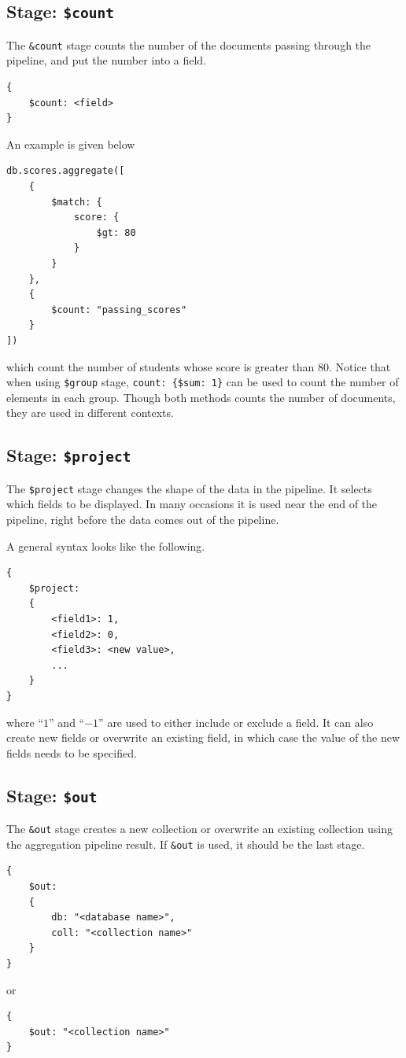 \subsection{Stage: \texttt{\$count}}

The \verb|&count| stage counts the number of the documents passing through the pipeline, and put the number into a field.
\begin{lstlisting}
{
	$count: <field>
}
\end{lstlisting}

An example is given below
\begin{lstlisting}
db.scores.aggregate([
	{
		$match: {
			score: {
				$gt: 80
			}
		}
	},
	{
		$count: "passing_scores"
	}
])
\end{lstlisting}
which count the number of students whose score is greater than $80$. Notice that when using \verb|$group| stage, \verb|count: {$sum: 1}| can be used to count the number of elements in each group. Though both methods counts the number of documents, they are used in different contexts.

\subsection{Stage: \texttt{\$project}}

The \verb|$project| stage changes the shape of the data in the pipeline. It selects which fields to be displayed. In many occasions it is used near the end of the pipeline, right before the data comes out of the pipeline. 

A general syntax looks like the following.
\begin{lstlisting}
{
	$project:
	{
		<field1>: 1,
		<field2>: 0,
		<field3>: <new value>,
		...
	}
}
\end{lstlisting}
where ``$1$'' and ``$-1$'' are used to either include or exclude a field. It can also create new fields or overwrite an existing field, in which case the value of the new fields needs to be specified.

\subsection{Stage: \texttt{\$out}}

The \verb|&out| stage creates a new collection or overwrite an existing collection using the aggregation pipeline result. If \verb|&out| is used, it should be the last stage.
\begin{lstlisting}
{
	$out:
	{
		db: "<database name>",
		coll: "<collection name>"
	}
}
\end{lstlisting}
or
\begin{lstlisting}
{
	$out: "<collection name>"
}
\end{lstlisting}

